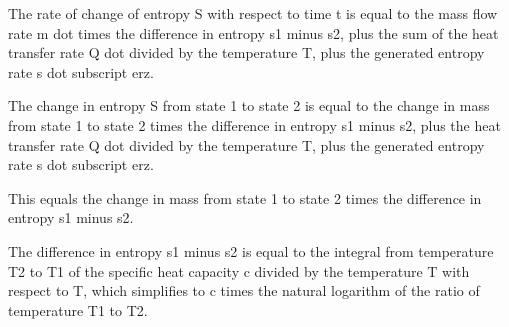 The rate of change of entropy S with respect to time t is equal to the mass flow rate m dot times the difference in entropy s1 minus s2, plus the sum of the heat transfer rate Q dot divided by the temperature T, plus the generated entropy rate s dot subscript erz.

The change in entropy S from state 1 to state 2 is equal to the change in mass from state 1 to state 2 times the difference in entropy s1 minus s2, plus the heat transfer rate Q dot divided by the temperature T, plus the generated entropy rate s dot subscript erz.

This equals the change in mass from state 1 to state 2 times the difference in entropy s1 minus s2.

The difference in entropy s1 minus s2 is equal to the integral from temperature T2 to T1 of the specific heat capacity c divided by the temperature T with respect to T, which simplifies to c times the natural logarithm of the ratio of temperature T1 to T2.